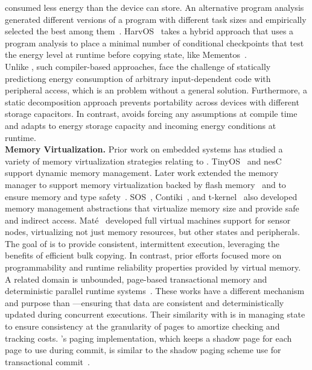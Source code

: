 consumed less energy than the device can store.
%
An alternative program analysis~\cite{baghsorkhi_cgo_2018} generated different
versions of a program with different task sizes and empirically selected the
best among them~\cite{baghsorkhi_cgo_2018}.
%
HarvOS~\cite{mottola2017harvos} takes a hybrid approach that uses a program
analysis to place a minimal number of conditional checkpoints that test the
energy level at runtime before copying state, like Mementos~\cite{mementos}. \\
%
Unlike \sys, such compiler-based approaches, face the challenge of statically
predictiong energy consumption of arbitrary input-dependent code with
peripheral access, which is an problem without a general solution. Furthermore,
a static decomposition approach prevents portability across devices with
different storage capacitors. In contrast, \sys avoids forcing any assumptions
at compile time and adapts to energy storage capacity and incoming energy
conditions at runtime. \\
%
\textbf{Memory Virtualization.} Prior work on embedded systems has studied a
variety of memory virtualization strategies relating to \sys.
TinyOS~\cite{levis2005tinyos} and nesC~\cite{nesc} support dynamic memory
management. Later work extended the memory manager to support memory
virtualization backed by flash memory~\cite{sensornetvm} and to ensure memory
and type safety~\cite{tinyosmemorysafety}. SOS~\cite{sos},
Contiki~\cite{contiki}, and t-kernel~\cite{tkernel} also developed memory
management abstractions that virtualize memory size and provide safe and
indirect access. Mat\'e~\cite{mate} developed full virtual machines support for
sensor nodes, virtualizing not just memory resources, but other states and
peripherals. The goal of \sys is to provide consistent, intermittent execution,
leveraging the benefits of efficient bulk copying. In contrast, prior efforts
focused more on programmability and runtime reliability properties provided by
virtual memory. \\
%
A related domain is unbounded, page-based transactional memory and
deterministic parallel runtime systems~\cite{pagebasedtm,grace}.  These works
have a different mechanism and purpose than \sys---ensuring that data are
consistent and deterministically updated during concurrent executions.  Their
similarity with \sys is in managing state to ensure consistency at
the granularity of pages to amortize checking and tracking costs.
\sys's paging implementation, which keeps a shadow page for each page to use
during commit, is similar to the shadow paging scheme use for transactional
commit~\cite{pagebasedtm}.